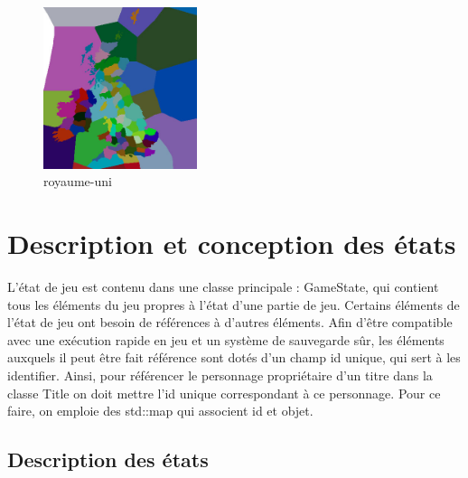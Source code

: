 \documentclass[a4paper,12pt]{article}
\begin{document}
\begin{figure}[hbtp]
\centering
\includegraphics[width=0.4\textwidth]{ru.jpg}
\caption{royaume-uni} 
\end{figure}

\clearpage
\section{Description et conception des états}

L'état de jeu est contenu dans une classe principale : GameState, qui contient tous les éléments du jeu propres à l'état d'une partie de jeu.
Certains éléments de l'état de jeu ont besoin de références à d'autres éléments. Afin d'être compatible avec une exécution rapide en jeu et un système de sauvegarde sûr, les éléments auxquels il peut être fait référence sont dotés d'un champ id unique, qui sert à les identifier. Ainsi, pour référencer le personnage propriétaire d'un titre dans la classe Title on doit mettre l'id unique correspondant à ce personnage. Pour ce faire, on emploie des std::map qui associent id et objet.

\subsection{Description des états}
\end{document}
